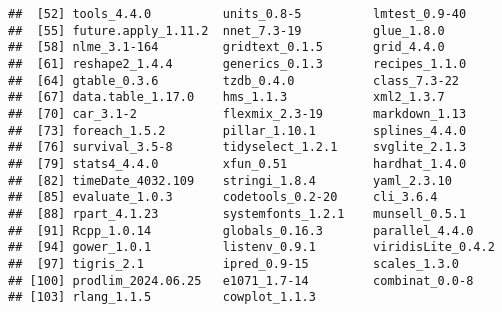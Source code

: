 \documentclass[
]{article}
\begin{document}
\begin{verbatim}
##  [52] tools_4.4.0          units_0.8-5          lmtest_0.9-40       
##  [55] future.apply_1.11.2  nnet_7.3-19          glue_1.8.0          
##  [58] nlme_3.1-164         gridtext_0.1.5       grid_4.4.0          
##  [61] reshape2_1.4.4       generics_0.1.3       recipes_1.1.0       
##  [64] gtable_0.3.6         tzdb_0.4.0           class_7.3-22        
##  [67] data.table_1.17.0    hms_1.1.3            xml2_1.3.7          
##  [70] car_3.1-2            flexmix_2.3-19       markdown_1.13       
##  [73] foreach_1.5.2        pillar_1.10.1        splines_4.4.0       
##  [76] survival_3.5-8       tidyselect_1.2.1     svglite_2.1.3       
##  [79] stats4_4.4.0         xfun_0.51            hardhat_1.4.0       
##  [82] timeDate_4032.109    stringi_1.8.4        yaml_2.3.10         
##  [85] evaluate_1.0.3       codetools_0.2-20     cli_3.6.4           
##  [88] rpart_4.1.23         systemfonts_1.2.1    munsell_0.5.1       
##  [91] Rcpp_1.0.14          globals_0.16.3       parallel_4.4.0      
##  [94] gower_1.0.1          listenv_0.9.1        viridisLite_0.4.2   
##  [97] tigris_2.1           ipred_0.9-15         scales_1.3.0        
## [100] prodlim_2024.06.25   e1071_1.7-14         combinat_0.0-8      
## [103] rlang_1.1.5          cowplot_1.1.3
\end{verbatim}
\end{document}
